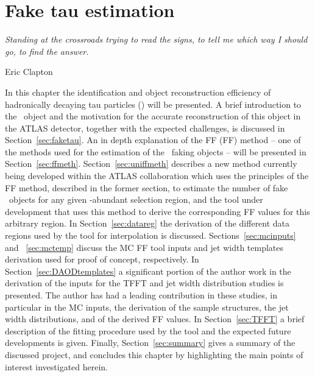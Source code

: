 \chapter{Fake tau estimation}
\label{ch:fake_est}
\epigraph{\emph{Standing at the crossroads trying to read the signs, to tell me which way I should go, to find the answer.}}{Eric Clapton}
In this chapter the identification and object reconstruction efficiency of hadronically decaying tau particles (\htau) will be presented.
A brief introduction to the \htau\ object and the motivation for the accurate reconstruction of this object in the \ac{ATLAS} detector, together with the expected challenges, is discussed in Section~\ref{sec:faketau}. 
An in depth explanation of the \acl{FF} (\ac{FF}) method -- one of the methods used for the estimation of the \htau\ faking objects -- will be presented in Section~\ref{sec:ffmeth}. 
Section~\ref{sec:uniffmeth} describes a new method currently being developed within the \ac{ATLAS} collaboration which uses the principles of the \ac{FF} method, described in the former section, to estimate the number of fake \htau\ objects for any given \htau -abundant selection region, and the tool under development that uses this method to derive the corresponding \ac{FF} values for this arbitrary region.
In Section~\ref{sec:datareg} the derivation of the different data regions used by the tool for interpolation is discussed. 
Sections~\ref{sec:mcinputs} and ~\ref{sec:mctemp} discuss the \ac{MC} \ac{FF} tool inputs and jet width templates derivation used for proof of concept, respectively. 
In Section~\ref{sec:DAODtemplates} a significant portion of the author work in the derivation of the inputs for the \ac{TFFT} and jet width distribution studies is presented.
The author has had a leading contribution in these studies, in particular in the \ac{MC} inputs, the derivation of the sample structures, the jet width distributions, and of the derived \ac{FF} values. 
In Section~\ref{sec:TFFT} a brief description of the fitting procedure used by the tool and the expected future developments is given. 
Finally, Section~\ref{sec:summary} gives a summary of the discussed project, and concludes this chapter by highlighting the main points of interest investigated herein.
